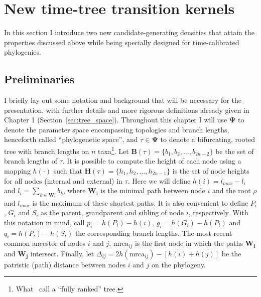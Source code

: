
\section{New time-tree transition kernels}
\label{sec:newKernels}

In this section I introduce two new candidate-generating densities that attain the properties discussed above while being specially designed for time-calibrated phylogenies.

\subsection{Preliminaries}
\label{sec:prelim}

I briefly lay out some notation and background that will be necessary for the presentation, with further details and more rigorous definitions already given in Chapter 1 (Section~\ref{sec:tree_space}).
Throughout this  chapter I will use $\boldsymbol\Psi$ to denote the parameter space encompassing topologies and branch lengths, henceforth called ``phylogenetic space'', and $\tau \in \boldsymbol\Psi$ to denote a bifurcating, rooted tree with branch lengths on $n$ taxa\footnote{What~\cite{Drummond2015} call a ``fully ranked'' tree.}.
Let $\mathbf{B}(\tau) =\{b_1, b_2, \ldots, b_{2n-2}\}$ be the set of branch lengths of $\tau$.
It is possible to compute the height of each node using a mapping $h(\cdot)$ such that $\mathbf{H}(\tau) = \{h_1, h_2, \ldots, h_{2n-1}\}$ is the set of node heights for all nodes (internal and external) in $\tau$.
Here we will define $h(i) = l_{max} - l_i$ and $l_i = \sum_{k \in \mathbf{W_i}} b_k$, where $\mathbf{W_i}$ is the minimal path between node $i$ and the root $\rho$ and $l_{max}$ is the maximum of these shortest paths.
It is also convenient to define $P_i$, $G_i$ and $S_i$ as the parent, grandparent and sibling of node $i$, respectively.
With this notation in mind, call $p_i = h(P_i)-h(i)$, $g_i = h(G_i)-h(P_i)$ and $q_i = h(P_i)-h(S_i)$ the corresponding branch lengths.
The most recent common ancestor of nodes $i$ and $j$, $\text{mrca}_{ij}$ is the first node in which the paths $\mathbf{W_i}$ and $\mathbf{W_j}$ intersect.
Finally, let $\Delta_{ij} = 2h(\text{mrca}_{ij}) - [ h(i)  + h(j) ]$ be the patristic (path) distance between nodes $i$ and $j$ on the phylogeny.


